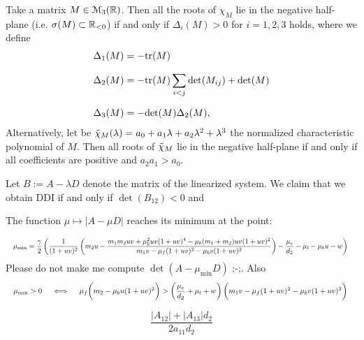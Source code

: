 \begin{theorem}
	Take a matrix $M \in \EuScript{M}_3(\mathbb{R})$. Then all the roots of $\chi_M$ lie in the negative half-plane (i.e. $\sigma(M) \subset \mathbb{R}_{<0}$) if and only if
	$\Delta_i(M) > 0$ for $i=1, 2, 3$ holds, where we define
	\begin{align*}
		\Delta_1(M) &= -\mathrm{tr}(M) \\[0.7em]
		\Delta_2(M) &= -\mathrm{tr}(M) \sum_{i < j} \mathrm{det}(M_{ij}) + \mathrm{det}(M) \\[0.7em]
		\Delta_3(M) &= -\mathrm{det}(M) \Delta_2(M),
	\end{align*}
Alternatively, let be $\Tilde{\chi}_{M}(\lambda) = a_0 + a_1 \lambda + a_2 \lambda^2 + \lambda^3$ the normalized characteristic polynomial of $M$. Then all roots of $\Tilde{\chi}_M$ lie in the negative half-plane if and only if all coefficients are positive and $a_2 a_1 > a_0$.
\end{theorem}


\begin{lemma} Let $B := A - \lambda D$ denote the matrix of the linearized system. We claim that we obtain DDI if and only if $\det(B_{12}) < 0$ and 
	
\end{lemma}


\begin{remark}[Minimum] The function $\mu \longmapsto |A - \mu D|$ reaches its minimum at the point:
	
\begin{equation}
	\resizebox{\hsize}{!}{%
		$\mu_{\mathbf{\mathrm{min}}} = \dfrac{\gamma}{2}\left( \dfrac{1}{(1+uv)^2}\left( m_2 u -  \dfrac{m_1m_2uv + \mu_b^2 uv(1+uv)^4 - \mu_b(m_1 + m_2) uv(1+uv)^2}{m_1 v - \mu_f (1 + uv)^2 - \mu_b v(1+uv)^2} \right)-\dfrac{\mu_e}{d_2} - \mu_l - \mu_b u - w\right) \notag$  
	}
\end{equation}
Please do not make me compute $\det(A - \mu_{\textrm{min}} D)$ ;-;. Also
\begin{equation}
	\resizebox{\hsize}{!}{%
		$\mu_{\mathbf{\mathrm{min}}} > 0 \quad \iff\quad \mu_f \biggl(m_2 - \mu_b u (1 + uv)^2\biggr) > \left( \dfrac{\mu_e}{d_2} + \mu_l + w \right) \biggl( m_1 v - \mu_f(1+uv)^2 - \mu_b v (1 + uv)^2\biggr) \notag$  
	}
\end{equation}
\end{remark}



$$\frac{|A_{12}| + |A_{13}|d_2}{2a_{11} d_2}$$


